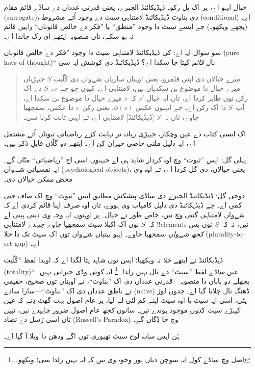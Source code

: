 \documentclass[../../../include/open-logic-section]{subfiles}
\begin{document}
خیال ایہو اے، پر اک پل رکو۔ ڈیڈیکائنڈ الجبرے، یعنی قدرتی عدداں دے
ساڈے قائم مقام (surrogate)، دی بناوٹ ڈیڈیکائنڈ لامتناہی سیٹ دے وجود
اُتے مشروط (conditional) اے۔ (پچھے
 ویکھو۔)
جے ایسے سیٹ دا وجود ”منطق“ یا ”فکر دے خالص قانوناں“ راہیں قائم نہ ہو
سکے، تاں منصوبہ ایتھے ای رک جاندا اے۔

سو سوال ایہ اے: کی ڈیڈیکائنڈ لامتناہی سیٹ دا وجود ”فکر دے خالص
قانوناں (pure laws of thought)“ نال \emph{قائم} کیتا جا سکدا اے؟
ڈیڈیکائنڈ دی کوشش ایہ سی:
\begin{quote}
  میرے خیالاں دی اپنی قلمرو، یعنی اوہناں ساریاں شےواں دی کُلّیت $S$
  جیہڑیاں میرے خیال دا موضوع بن سکدیاں نیں، لامتناہی اے۔ کیوں جو جے
  $s$،~$S$ دے اک رکن نوں ظاہر کردا اے، تاں ایہ خیال $s'$ کہ~$s$ میرے
  خیال دا موضوع بن سکدا اے، آپ~$S$ دا اک رکن اے۔ جے ایہنوں عکس
  $\phi(s)$، یعنی رکن~$s$ دا عکس، سمجھیا جاوے، تاں \dots~$S$ [ڈیڈیکائنڈ]
  لامتناہی اے، تے ایہی ثابت کرنا سی۔
	\citep[\S66]{Dedekind1888}
\end{quote}
اک ایسی کتاب دے عین وچکار، جیہڑی زیادہ تر نہایت کڑے ریاضیاتی ثبوتاں
اُتے مشتمل اے، ایہ دلیل ملنی خاصی حیران کن اے۔ ایتھے دو گلّاں قابلِ
ذکر نیں۔

پہلی گل: ایس ”ثبوت“ وچ اوہ کردار شاید ہی اے جیہنوں اسی اج
”ریاضیاتی“ منّاں گے۔ ایہ نفسیاتی شےواں (psychological objects)، یعنی
خیالاں، دی گل کردا اے، تے اوہ وی محض \emph{ممکن} خیالاں دی۔

دوجی گل: ڈیڈیکائنڈ الجبرے دی ساڈی پیشکش مطابق ایس ”ثبوت“ وچ اک صاف
فنی کمی اے۔ جے ڈیڈیکائنڈ دی دلیل کامیاب وی ہووے، تاں اوہ صرف اینا
قائم کردی اے کہ شےواں لامتناہی گنتی وچ نیں، خاص طور تے خیال۔ پر اوہنوں
ایہ وجہ وی دینی پینی اے کہ~$S$ نوں اک اکیلا \emph{سیٹ} سمجھیا جاوے
جیہدے لامتناہی !!{element}s نیں، نہ کہ~$S$ نوں بس \emph{کجھ شےواں}
سمجھیا جاوے۔ ایہو بہتیاں شےواں توں اک سیٹ تک دا خلا
(plurality-to-set gap) اے۔

ڈیڈیکائنڈ نے ایتھے خلا نہ ویکھیا؛ ایس توں شاید پتا لگدا اے کہ اوہدا
لفظ ”کُلّیت (totality)“ عین \emph{ساڈے} لفظ ”سیٹ“ دے نال نہیں رلدا۔
\footnote{اصل وچ ساڈے کول ایہ سوچن دیاں ہور وجوہ وی نیں کہ ایہ نہیں
رلدا سی؛ \citet[p.~23]{Potter2004} ویکھو۔} ایہ کوئی وڈی حیرانی نہیں۔
پچھلے دو باباں دا منصوبہ---قدرتی عدداں دی اک ”بناوٹ“، تے اوہناں توں
صحیح، حقیقی تے ناطق عدداں دی اک ”بناوٹ“---سارا سادے (naive) ڈھنگ نال
چلایا گیا اے۔ جدوں لوڑ پئی، اسی ایہ سیٹ یا اوہ سیٹ اپنے کم لئی لے
لیا، پر عام اصول بہت گھٹ دِتے کہ عین کیہڑے سیٹ کدوں موجود ہوندے نیں۔
سانوں \emph{کجھ} عام اصول ضرور چاہیدے نیں، نہیں تاں اسی رَسل دے تضاد
(Russell's Paradox) وچ جا ڈِگاں گے۔

ہُن ایس سادہ لوح سیٹ تھیوری توں اگے ودھن دا ویلا آ گیا اے۔
\end{document}
